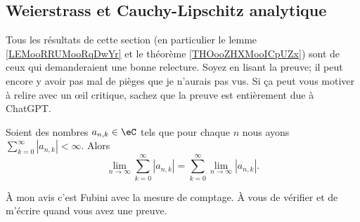 \subsection{Weierstrass et Cauchy-Lipschitz analytique}

\begin{probleme}
	Tous les résultats de cette section (en particulier le lemme \ref{LEMooRRUMooRqDwYr} et le théorème \ref{THOooZHXMooICpUZx}) sont de ceux qui demanderaient une bonne relecture. Soyez  en lisant la preuve; il peut encore y avoir pas mal de pièges que je n'aurais pas vus. Si ça peut vous motiver à relire avec un œil critique, sachez que la preuve est entièrement due à ChatGPT.
\end{probleme}

\begin{lemma}	\label{LEMooVXTLooHYvAWO}
	Soient des nombres \( a_{n,k}\in \eC\) tels que pour chaque \( n\) nous ayons \( \sum_{k=0}^{\infty}| a_{n,k} |<\infty\). Alors
	\begin{equation}
		\lim_{n\to \infty}\sum_{k=0}^{\infty}| a_{n,k} |=\sum_{k=0}^{\infty}\lim_{n\to \infty}| a_{n,k} |.
	\end{equation}
\end{lemma}
À mon avis c'est Fubini avec la mesure de comptage. À vous de vérifier et de m'écrire quand vous avez une preuve.

